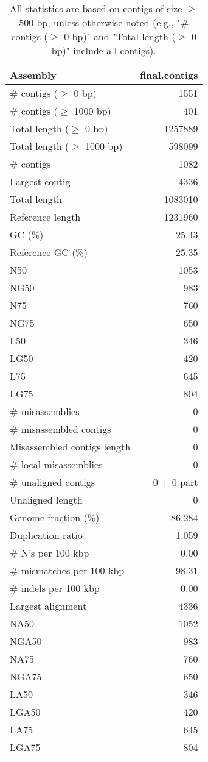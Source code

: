 \documentclass[12pt,a4paper]{article}
\begin{document}
\begin{table}[ht]
\begin{center}
\caption{All statistics are based on contigs of size $\geq$ 500 bp, unless otherwise noted (e.g., "\# contigs ($\geq$ 0 bp)" and "Total length ($\geq$ 0 bp)" include all contigs).}
\begin{tabular}{|l*{1}{|r}|}
\hline
Assembly & final.contigs \\ \hline
\# contigs ($\geq$ 0 bp) & 1551 \\ \hline
\# contigs ($\geq$ 1000 bp) & 401 \\ \hline
Total length ($\geq$ 0 bp) & 1257889 \\ \hline
Total length ($\geq$ 1000 bp) & 598099 \\ \hline
\# contigs & 1082 \\ \hline
Largest contig & 4336 \\ \hline
Total length & 1083010 \\ \hline
Reference length & 1231960 \\ \hline
GC (\%) & 25.43 \\ \hline
Reference GC (\%) & 25.35 \\ \hline
N50 & 1053 \\ \hline
NG50 & 983 \\ \hline
N75 & 760 \\ \hline
NG75 & 650 \\ \hline
L50 & 346 \\ \hline
LG50 & 420 \\ \hline
L75 & 645 \\ \hline
LG75 & 804 \\ \hline
\# misassemblies & 0 \\ \hline
\# misassembled contigs & 0 \\ \hline
Misassembled contigs length & 0 \\ \hline
\# local misassemblies & 0 \\ \hline
\# unaligned contigs & 0 + 0 part \\ \hline
Unaligned length & 0 \\ \hline
Genome fraction (\%) & 86.284 \\ \hline
Duplication ratio & 1.059 \\ \hline
\# N's per 100 kbp & 0.00 \\ \hline
\# mismatches per 100 kbp & 98.31 \\ \hline
\# indels per 100 kbp & 0.00 \\ \hline
Largest alignment & 4336 \\ \hline
NA50 & 1052 \\ \hline
NGA50 & 983 \\ \hline
NA75 & 760 \\ \hline
NGA75 & 650 \\ \hline
LA50 & 346 \\ \hline
LGA50 & 420 \\ \hline
LA75 & 645 \\ \hline
LGA75 & 804 \\ \hline
\end{tabular}
\end{center}
\end{table}
\end{document}
